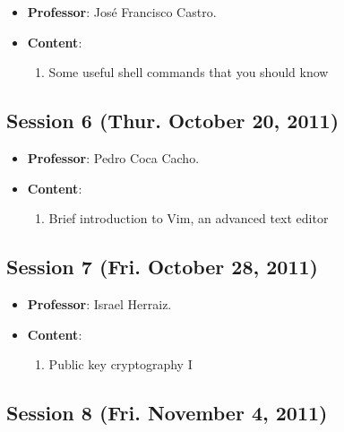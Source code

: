 \documentclass[a4paper]{article}
\begin{document}
\begin{itemize}
 \item \textbf{Professor}: José Francisco Castro.

 \item \textbf{Content}:

 \begin{enumerate}
  \item Some useful shell commands that you should know
 \end{enumerate}

\end{itemize}

\subsection{Session 6 (Thur. October 20, 2011)}

\begin{itemize}
 \item \textbf{Professor}: Pedro Coca Cacho.

 \item \textbf{Content}:

 \begin{enumerate}
  \item Brief introduction to Vim, an advanced text editor
 \end{enumerate}

\end{itemize}

\subsection{Session 7 (Fri. October 28, 2011)}

\begin{itemize}
 \item \textbf{Professor}: Israel Herraiz.

 \item \textbf{Content}:

 \begin{enumerate}
  \item Public key cryptography I
 \end{enumerate}

\end{itemize}

\subsection{Session 8 (Fri. November 4, 2011)}
\end{document}
